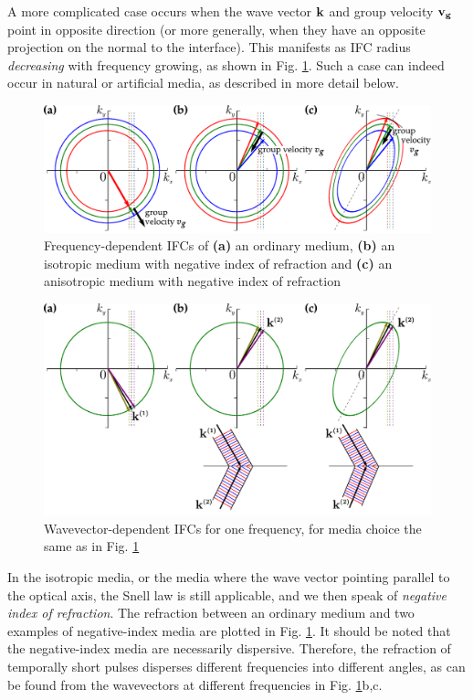 A more complicated case occurs when the wave vector ${\mathbf{k}}$ and group velocity ${\mathbf{v_g}}$ point in opposite direction (or more generally, when they have an opposite projection on the normal to the interface).  This manifests as IFC radius \textit{decreasing} with frequency growing, as shown in  Fig. \ref{fg_ifcnr}.
Such a case can indeed occur in natural or artificial media, as described in more detail below. 
\begin{figure}[ht] \caption{Frequency-dependent IFCs of \textbf{(a)} an ordinary medium, \textbf{(b)} an isotropic medium with negative index of refraction and \textbf{(c)} an anisotropic medium with negative index of refraction } \label{fg_ifcnr} \centering  %
	\includegraphics[width=.8\textwidth]{img/ifc_negrefr.pdf} 
\end{figure}
\begin{figure}[ht] \caption{Wavevector-dependent IFCs for one frequency, for media choice the same as in Fig. \ref{fg_ifcnr} } \label{fg_ifcnrk} \centering  %
	\includegraphics[width=.8\textwidth]{img/ifc_negrefrk.pdf} 
\end{figure}

In the isotropic media, or the media where the wave vector pointing parallel to the optical axis, the Snell law is still applicable, and we then speak of \textit{negative index of refraction}.  The refraction between an ordinary medium and two examples of negative-index media are plotted in Fig. \ref{fg_ifcnr}.
It should be noted that the negative-index media are necessarily dispersive. Therefore, the refraction of temporally short pulses disperses different frequencies into different angles, as can be found from the wavevectors at different frequencies in Fig. \ref{fg_ifcnr}b,c.

